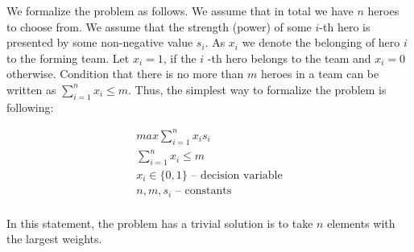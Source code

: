 \documentclass[smallextended]{svjour3}       %
\begin{document}
We formalize the problem as follows. We assume that in total we have $n$ heroes to choose from. We assume that the strength (power) of some $i$-th hero is presented by some non-negative value $s_i$. As $x_i$ we denote the belonging of hero $i$ to the forming team. Let $ x_i = 1 $, if the $ i $ -th hero belongs to the team and $ x_i = 0 $ otherwise.  Condition that there is no more than $m$ heroes in a team can be written as $ \sum_{i=1}^n x_i \leq m $. 
Thus, the simplest way to formalize the problem is following:

\begin{equation}
\begin{gathered}
    max \sum_{i=1}^n x_i s_i \\
    \sum_{i=1}^n x_i \leq m \\
    x_i \in \{0, 1\} \text{ – decision variable} \\
   n, m, s_i \text{ – constants}  \\
\end{gathered}
\end{equation}

In this statement, the problem has a trivial solution is to take $ n $ elements with the largest weights.
\end{document}
